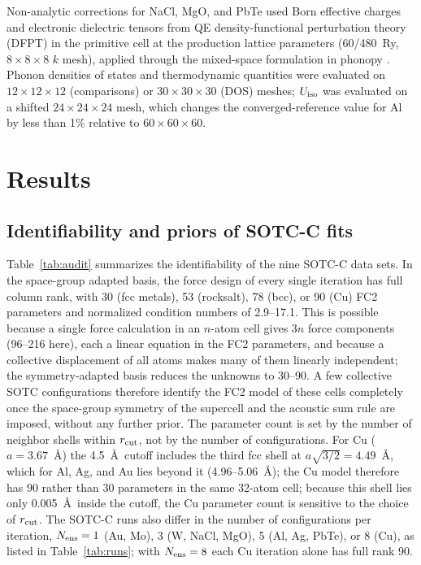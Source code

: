 \documentclass[aip,jap,reprint,amsmath,amssymb,floatfix]{revtex4-2}
\begin{document}
Non-analytic corrections for NaCl, MgO, and PbTe used Born effective charges and
electronic dielectric tensors from QE density-functional perturbation theory (DFPT) in
the primitive cell at the production lattice parameters (60/480~Ry,
$8\times8\times8$ $k$ mesh), applied through the mixed-space formulation in
phonopy \cite{ref53}. Phonon densities of states and thermodynamic quantities
were evaluated on $12\times12\times12$ (comparisons) or $30\times30\times30$
(DOS) meshes; $U_{\rm iso}$ was evaluated on a shifted $24\times24\times24$
mesh, which changes the converged-reference value for Al by less than 1\%
relative to $60\times60\times60$.

\section{Results}\label{sec:results}

\subsection{Identifiability and priors of SOTC-C fits}\label{sec:audit}

Table~\ref{tab:audit} summarizes the identifiability of the nine SOTC-C data
sets. In the space-group adapted basis, the force design of every single
iteration has full column rank, with 30 (fcc metals), 53 (rocksalt), 78
(bcc), or 90 (Cu) FC2 parameters and normalized condition numbers of
2.9--17.1. This is possible because a single force calculation in an
$n$-atom cell gives $3n$ force components (96--216 here), each a linear
equation in the FC2 parameters, and because a collective displacement of all
atoms makes many of them linearly independent; the symmetry-adapted basis reduces
the unknowns to 30--90. A few collective SOTC configurations therefore
identify the FC2 model of these cells completely once the space-group
symmetry of the supercell and the acoustic sum rule are imposed, without any
further prior.
The parameter count is set by the number of neighbor shells within $r_{\rm
cut}$, not by the number of configurations. For Cu ($a=3.67$~\AA) the
4.5~\AA\ cutoff includes the third fcc shell at $a\sqrt{3/2}=4.49$~\AA, which
for Al, Ag, and Au lies beyond it (4.96--5.06~\AA); the Cu model therefore has
90 rather than 30 parameters in the same 32-atom cell; because this shell
lies only 0.005~\AA\ inside the cutoff, the Cu parameter count is sensitive
to the choice of $r_{\rm cut}$. The SOTC-C runs also
differ in the number of configurations per iteration, $N_{\rm ens}=1$ (Au,
Mo), 3 (W, NaCl, MgO), 5 (Al, Ag, PbTe), or 8 (Cu), as listed in
Table~\ref{tab:runs}; with $N_{\rm ens}=8$ each Cu iteration alone has full
rank 90.
\end{document}
